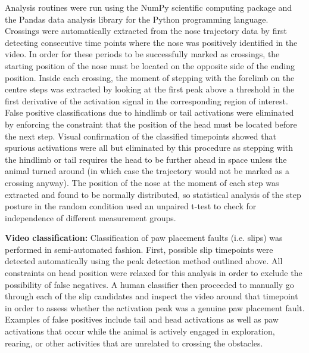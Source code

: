 Analysis routines were run using the NumPy scientific computing package \cite{Walt2011} and the Pandas data analysis library \cite{McKinney2010} for the Python programming language. Crossings were automatically extracted from the nose trajectory data by first detecting consecutive time points where the nose was positively identified in the video. In order for these periods to be successfully marked as crossings, the starting position of the nose must be located on the opposite side of the ending position. Inside each crossing, the moment of stepping with the forelimb on the centre steps was extracted by looking at the first peak above a threshold in the first derivative of the activation signal in the corresponding region of interest. False positive classifications due to hindlimb or tail activations were eliminated by enforcing the constraint that the position of the head must be located before the next step. Visual confirmation of the classified timepoints showed that spurious activations were all but eliminated by this procedure as stepping with the hindlimb or tail requires the head to be further ahead in space unless the animal turned around (in which case the trajectory would not be marked as a crossing anyway). The position of the nose at the moment of each step was extracted and found to be normally distributed, so statistical analysis of the step posture in the random condition used an unpaired t-test to check for independence of different measurement groups.

\textbf{Video classification:} Classification of paw placement faults (i.e. slips) was performed in semi-automated fashion. First, possible slip timepoints were detected automatically using the peak detection method outlined above. All constraints on head position were relaxed for this analysis in order to exclude the possibility of false negatives. A human classifier then proceeded to manually go through each of the slip candidates and inspect the video around that timepoint in order to assess whether the activation peak was a genuine paw placement fault. Examples of false positives include tail and head activations as well as paw activations that occur while the animal is actively engaged in exploration, rearing, or other activities that are unrelated to crossing the obstacles.

